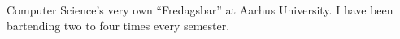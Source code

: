 
Computer Science's very own ``Fredagsbar'' at Aarhus University. I have been bartending two to four
times every semester.
